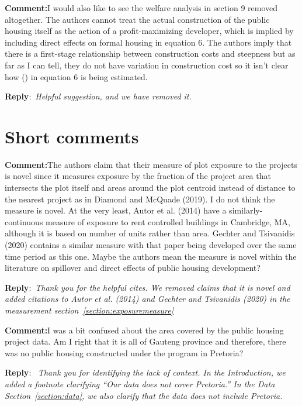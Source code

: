 \documentclass{article}
\newcommand{\reply}{\medskip \noindent \textbf{Reply}:\ \textit }
\newcommand{\sr}{\begin{minipage}{\dimexpr\textwidth-3cm}}
\newcommand{\er}{\end{minipage}}
\newcommand{\cc}{\medskip \noindent \textbf{Comment:}\hspace{2em}}
\begin{document}
\cc I would also like to see the welfare analysis in section 9 removed altogether. The authors cannot treat the actual construction of the public housing itself as the action of a profit-maximizing developer, which is implied by including direct effects on formal housing in equation 6. The authors imply that there is a first-stage relationship between construction costs and steepness but as far as I can tell, they do not have variation in construction cost so it isn't clear how () in equation 6 is being estimated.

\sr
\reply{Helpful suggestion, and we have removed it.}\\
\er

\section{Short comments}

\cc The authors claim that their measure of plot exposure to the projects is novel since it measures exposure by the fraction of the project area that intersects the plot itself and areas around the plot centroid instead of distance to the nearest project as in Diamond and McQuade (2019). I do not think the measure is novel. At the very least, Autor et al. (2014) have a similarly-continuous measure of exposure to rent controlled buildings in Cambridge, MA, although it is based on number of units rather than area. Gechter and Tsivanidis (2020) contains a similar measure with that paper being developed over the same time period as this one. Maybe the authors mean the measure is novel within the literature on spillover and direct effects of public housing development?

\sr
\reply{Thank you for the helpful cites.  We removed claims that it is novel and added citations to Autor et al. (2014) and Gechter and Tsivanidis (2020) in the measurement section~\ref{section:exposuremeasure}}\\
\er

\cc I was a bit confused about the area covered by the public housing project data. Am I right that it is all of Gauteng province and therefore, there was no public housing constructed under the program in Pretoria?

\sr
\reply{ Thank you for identifying the lack of context. In the Introduction, we added a footnote clarifying ``Our data does not cover Pretoria.''  In the Data Section~\ref{section:data}, we also clarify that the data does not include Pretoria.}\\
\er
\end{document}
